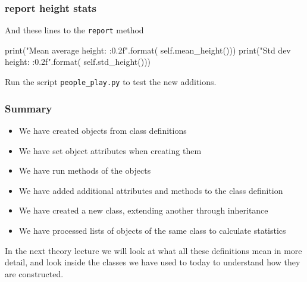 \documentclass{beamer}
\begin{document}
\begin{frame}[fragile]
\frametitle{report height stats}
And these lines to the \texttt{report} method
\begin{shaded}
\begin{code} 
        print("Mean average height: {:0.2f}".format(
                                  self.mean_height()))
        print("Std dev height: {:0.2f}".format(
                                   self.std_height()))
\end{code}
\end{shaded}
Run the script \texttt{people\_play.py} to test the new additions.

\end{frame}

\begin{frame}[fragile]
\frametitle{Summary}
\begin{itemize}
\item We have created objects from class definitions
\item We have set object attributes when creating them
\item We have run methods of the objects
\item We have added additional attributes and methods to the class definition
\item We have created a new class, extending another through inheritance
\item We have processed lists of objects of the same class to calculate statistics
\end{itemize}
In the next theory lecture we will look at what all these definitions mean in more detail, 
and look inside the classes we have used to today to understand how they are constructed.

\end{frame}
\end{document}
